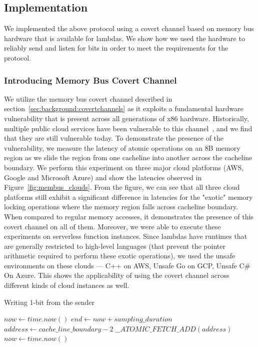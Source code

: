\subsection{Implementation}
\label{sec:method:impl}
We implemented the above protocol using a covert channel based on memory bus hardware 
that is available for lambdas. We show how we used the hardware to reliably send and 
listen for bits in order to meet the requirements for the protocol. 

\subsubsection{Introducing Memory Bus Covert Channel}
We utilize the memory bus covert channel described in
section~\ref{sec:background:covertchannels} as it exploits a fundamental
hardware vulnerability that is present across all generations of x86 hardware.
Historically, multiple public cloud services have been vulnerable to this
channel~\cite{varad191016,zhang2016}, and we find that they are still
vulnerable today. To demonstrate the presence of the vulnerability, we measure
the latency of atomic operations on an 8B memory region as we slide the region
from one cacheline into another across the cacheline boundary. We perform this
experiment on three major cloud platforms (AWS, Google and Microsoft Azure) and
show the latencies observed in Figure~\ref{fig:membus_clouds}. From the figure,
we can see that all three cloud platforms still exhibit a significant difference
in latencies for the "exotic" memory locking operations where the memory region
falls across cacheline boundary. When compared to regular memory accesses,
it demonstrates the presence of this covert channel on all of them. Moreover, we
were able to execute these experiments on serverless function instances. Since
lambdas have runtimes that are generally restricted to high-level languages
(that prevent the pointer arithmetic required to perform these exotic
operations), we used the unsafe environments on these clouds --- C++ on AWS,
Unsafe Go on GCP, Unsafe C\# On Azure. This shows the applicability of using the
covert channel across different kinds of cloud instances as well.

\begin{algorithm}[!t]
\caption{Writing 1-bit from the sender}
\label{alg:sender}
\begin{algorithmic}
\STATE $now \leftarrow  time.now()$
\STATE $end \leftarrow now + sampling\_duration$
\STATE $address \leftarrow cache\_line\_boundary-2$
    \STATE $\_\_ATOMIC\_FETCH\_ADD(address)$
    \STATE $now \leftarrow  time.now()$
\ENDWHILE
\end{algorithmic}
\end{algorithm}

